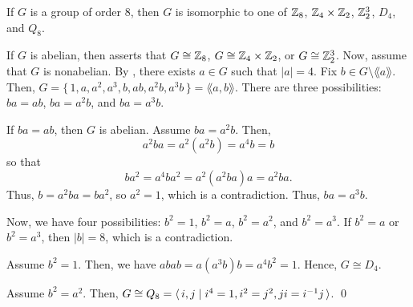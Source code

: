 \documentclass[../modern_algebra.tex]{subfiles}
\begin{document}
\begin{Theorem}{\textsf{}}{}
    If \(G\) is a group of order 8, then
    \(G\) is isomorphic to one of \(\ZZ_8\), \(\ZZ_4 \times \ZZ_2\), \(\ZZ_2^3\),
    \(D_4\), and \(Q_8\).
\end{Theorem}
\begin{myclaim}[Proof]
    If \(G\) is abelian, then  asserts that
    \(G \cong \ZZ_8\), \(G \cong \ZZ_4 \times \ZZ_2\), or \(G \cong \ZZ_2^3\).
    Now, assume that \(G\) is nonabelian.
    By , there exists \(a \in G\) such that \(|a| = 4\).
    Fix \(b \in G \setminus \lang a \rang\).
    Then,
    \(G = \{\,1, a, a^2, a^3, b, ab, a^2b, a^3b\,\} = \lang a, b \rang\).
    There are three possibilities: \(ba = ab\), \(ba = a^2b\), and \(ba = a^3b\).
    \begin{itemize}[nolistsep, leftmargin=*, listparindent=\parindent]
        \ii
        If \(ba = ab\), then \(G\) is abelian.
        \ii
        Assume \(ba = a^2b\). Then,
        \[
            a^2ba = a^2(a^2b) = a^4b = b
        \]
        so that
        \[
            ba^2 = a^4ba^2 = a^2(a^2ba)a = a^2ba.
        \]
        Thus, \(b = a^2ba = ba^2\), so \(a^2 = 1\), which is a contradiction.
        Thus, \(ba = a^3b\).
    \end{itemize}
    Now, we have four possibilities: \(b^2 = 1\), \(b^2 = a\), \(b^2 = a^2\), and \(b^2 = a^3\).
    If \(b^2 = a\) or \(b^2 = a^3\), then \(|b| = 8\), which is a contradiction.
    \begin{itemize}[nolistsep, leftmargin=*, listparindent=\parindent]
        \ii
        Assume \(b^2 = 1\).
        Then, we have \(abab = a(a^3b)b = a^4 b^2 = 1\).
        Hence, \(G \cong D_4\).

        \ii
        Assume \(b^2 = a^2\).
        Then, \(G \cong Q_8 = \langle\,i, j \mid i^4 = 1, i^2 = j^2, ji = i^{-1} j\,\rangle\).
        \qed
    \end{itemize}
\end{myclaim}
\end{document}
